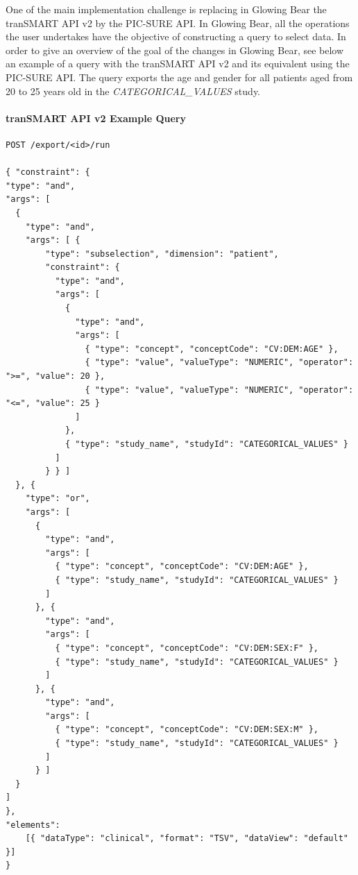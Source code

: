 One of the main implementation challenge is replacing in Glowing Bear the tranSMART API v2 by the PIC-SURE API.
In Glowing Bear, all the operations the user undertakes have the objective of constructing a query to select data.
In order to give an overview of the goal of the changes in Glowing Bear, see below an example of a query with the tranSMART API v2 and its equivalent using the PIC-SURE API.
The query exports the age and gender for all patients aged from 20 to 25 years old in the \emph{CATEGORICAL\_VALUES} study.


\paragraph{tranSMART API v2 Example Query}
\begin{verbatim}
POST /export/<id>/run

{ "constraint": {
"type": "and",
"args": [
  {
    "type": "and",
    "args": [ {
        "type": "subselection", "dimension": "patient",
        "constraint": {
          "type": "and",
          "args": [
            {
              "type": "and",
              "args": [
                { "type": "concept", "conceptCode": "CV:DEM:AGE" },
                { "type": "value", "valueType": "NUMERIC", "operator": ">=", "value": 20 },
                { "type": "value", "valueType": "NUMERIC", "operator": "<=", "value": 25 }
              ]
            },
            { "type": "study_name", "studyId": "CATEGORICAL_VALUES" }
          ]
        } } ]
  }, {
    "type": "or",
    "args": [
      {
        "type": "and",
        "args": [
          { "type": "concept", "conceptCode": "CV:DEM:AGE" },
          { "type": "study_name", "studyId": "CATEGORICAL_VALUES" }
        ]
      }, {
        "type": "and",
        "args": [
          { "type": "concept", "conceptCode": "CV:DEM:SEX:F" },
          { "type": "study_name", "studyId": "CATEGORICAL_VALUES" }
        ]
      }, {
        "type": "and",
        "args": [
          { "type": "concept", "conceptCode": "CV:DEM:SEX:M" },
          { "type": "study_name", "studyId": "CATEGORICAL_VALUES" }
        ]
      } ]
  }
]
},
"elements": 
    [{ "dataType": "clinical", "format": "TSV", "dataView": "default" }]
}
\end{verbatim}

